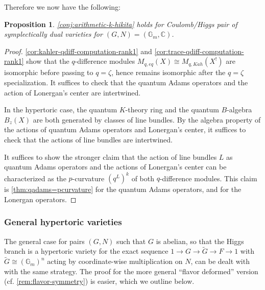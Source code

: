 \documentclass[reqno]{amsart}
\numberwithin{equation}{section}
\numberwithin{equation}{section}
\numberwithin{equation}{section}
\newtheorem{prop}[thm]{Proposition}
\theoremstyle{definition}
\theoremstyle{remark}
\theoremstyle{remark}
\begin{document}
Therefore we now have the following:

\begin{prop}\label{prop:arithmetic-k-hikta-hypertoric-rank1}
    \cref{conj:arithmetic-k-hikita} holds for Coulomb/Higgs pair of symplectically dual varieties for $(G,N) = (\mathbb{G}_m, \mathbb{C})$.
\end{prop}
\begin{proof}
    \cref{cor:kahler-qdiff-computation-rank1} and \cref{cor:trace-qdiff-computation-rank1} show that the $q$-difference modules $M_{q, eq} (X) \cong M_{q, Kah}(X^!)$ are isomorphic before passing to $q  = \zeta$, hence remains isomorphic after the $q=\zeta$ specialization. It suffices to check that the quantum Adams operators and the action of Lonergan's center are intertwined.

    In the hypertoric case, the quantum $K$-theory ring and the quantum $B$-algebra $B_z(X)$ are both generated by classes of line bundles. By the algebra property of the actions of quantum Adams operators and Lonergan's center, it suffices to check that the actions of line bundles are intertwined.

    It suffices to show the stronger claim that the action of line bundles $L$ as quantum Adams operators and the actions of Lonergan's center can be characterized as the $p$-curvature $(q^L)^k$ of both $q$-difference modules. This claim is \cref{thm:qadams=pcurvature} for the quantum Adams operators, and \cite[Example 4.4]{lonergan} for the Lonergan operators.
\end{proof}

\subsubsection{General hypertoric varieties}
The general case for pairs $(G,N)$ such that $G$ is abelian, so that the Higgs branch is a hypertoric variety for the exact sequence $1 \to G \to \widetilde{G} \to F \to 1$ with $\widetilde{G} \cong (\mathbb{G}_m)^n$ acting by coordinate-wise multiplication on $N$, can be dealt with with the same strategy. The proof for the more general ``flavor deformed'' version (cf. \cref{rem:flavor-symmetry}) is easier, which we outline below.
\end{document}
